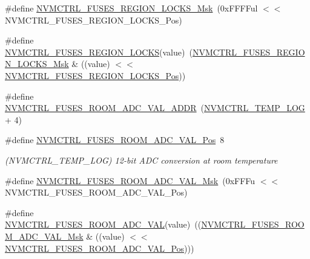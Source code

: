 \begin{DoxyCompactItemize}
\#define \mbox{\hyperlink{group__fuses__api_gad7be5211197af07d4d82363d29264bf9}{N\+V\+M\+C\+T\+R\+L\+\_\+\+F\+U\+S\+E\+S\+\_\+\+R\+E\+G\+I\+O\+N\+\_\+\+L\+O\+C\+K\+S\+\_\+\+Msk}}~(0x\+F\+F\+F\+Ful $<$$<$ N\+V\+M\+C\+T\+R\+L\+\_\+\+F\+U\+S\+E\+S\+\_\+\+R\+E\+G\+I\+O\+N\+\_\+\+L\+O\+C\+K\+S\+\_\+\+Pos)
\item 
\#define \mbox{\hyperlink{group__fuses__api_ga61ade65b0ec65479f42594be4d9ba94f}{N\+V\+M\+C\+T\+R\+L\+\_\+\+F\+U\+S\+E\+S\+\_\+\+R\+E\+G\+I\+O\+N\+\_\+\+L\+O\+C\+KS}}(value)~(\mbox{\hyperlink{group__fuses__api_gad7be5211197af07d4d82363d29264bf9}{N\+V\+M\+C\+T\+R\+L\+\_\+\+F\+U\+S\+E\+S\+\_\+\+R\+E\+G\+I\+O\+N\+\_\+\+L\+O\+C\+K\+S\+\_\+\+Msk}} \& ((value) $<$$<$ \mbox{\hyperlink{group__fuses__api_ga553b4d761e65080381c6af440abee0f0}{N\+V\+M\+C\+T\+R\+L\+\_\+\+F\+U\+S\+E\+S\+\_\+\+R\+E\+G\+I\+O\+N\+\_\+\+L\+O\+C\+K\+S\+\_\+\+Pos}}))
\item 
\#define \mbox{\hyperlink{group__fuses__api_ga3cd3b88d04873665b1ce924b685711a7}{N\+V\+M\+C\+T\+R\+L\+\_\+\+F\+U\+S\+E\+S\+\_\+\+R\+O\+O\+M\+\_\+\+A\+D\+C\+\_\+\+V\+A\+L\+\_\+\+A\+D\+DR}}~(\mbox{\hyperlink{group___s_a_m_d21_j18_a__base_gae900d443ec6d7cf1c90d21b6662fa447}{N\+V\+M\+C\+T\+R\+L\+\_\+\+T\+E\+M\+P\+\_\+\+L\+OG}} + 4)
\item 
\#define \mbox{\hyperlink{group__fuses__api_gab18b97e87d18589e6efa8423dd12c6c1}{N\+V\+M\+C\+T\+R\+L\+\_\+\+F\+U\+S\+E\+S\+\_\+\+R\+O\+O\+M\+\_\+\+A\+D\+C\+\_\+\+V\+A\+L\+\_\+\+Pos}}~8
\begin{DoxyCompactList}\small\item\em (N\+V\+M\+C\+T\+R\+L\+\_\+\+T\+E\+M\+P\+\_\+\+L\+OG) 12-\/bit A\+DC conversion at room temperature \end{DoxyCompactList}\item 
\#define \mbox{\hyperlink{group__fuses__api_gab74bb49e2241a91fbca615aaa5583021}{N\+V\+M\+C\+T\+R\+L\+\_\+\+F\+U\+S\+E\+S\+\_\+\+R\+O\+O\+M\+\_\+\+A\+D\+C\+\_\+\+V\+A\+L\+\_\+\+Msk}}~(0x\+F\+F\+Fu $<$$<$ N\+V\+M\+C\+T\+R\+L\+\_\+\+F\+U\+S\+E\+S\+\_\+\+R\+O\+O\+M\+\_\+\+A\+D\+C\+\_\+\+V\+A\+L\+\_\+\+Pos)
\item 
\#define \mbox{\hyperlink{group__fuses__api_gaebf0b6ce2279c66f7d62b28e76f912da}{N\+V\+M\+C\+T\+R\+L\+\_\+\+F\+U\+S\+E\+S\+\_\+\+R\+O\+O\+M\+\_\+\+A\+D\+C\+\_\+\+V\+AL}}(value)~((\mbox{\hyperlink{group__fuses__api_gab74bb49e2241a91fbca615aaa5583021}{N\+V\+M\+C\+T\+R\+L\+\_\+\+F\+U\+S\+E\+S\+\_\+\+R\+O\+O\+M\+\_\+\+A\+D\+C\+\_\+\+V\+A\+L\+\_\+\+Msk}} \& ((value) $<$$<$ \mbox{\hyperlink{group__fuses__api_gab18b97e87d18589e6efa8423dd12c6c1}{N\+V\+M\+C\+T\+R\+L\+\_\+\+F\+U\+S\+E\+S\+\_\+\+R\+O\+O\+M\+\_\+\+A\+D\+C\+\_\+\+V\+A\+L\+\_\+\+Pos}})))

\end{DoxyCompactItemize}

